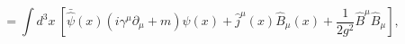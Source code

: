 \begin{equation}
=\int d^{3}x ~[\bar {\hat\psi}(x)(i\gamma^{\mu}\partial_{\mu}+m)\hat \psi(x)+\hat j^{\mu}(x)\hat B_{\mu}(x)+\frac{1}{2g^{2}}\hat B^{\mu}\hat B_{\mu}],
\label{aux}
\end{equation}


